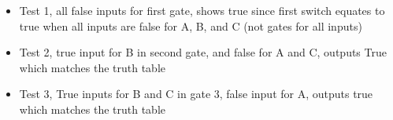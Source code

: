 \documentclass{article}
\begin{document}
\begin{itemize}
    \item Test 1, all false inputs for first gate, shows true since first switch equates to true when all inputs are false for A, B, and C (not gates for all inputs)\newline
    \newline
    
    \item Test 2, true input for B in second gate, and false for A and C, outputs True which matches the truth table\newline
    \newline
    
    \item Test 3, True inputs for B and C in gate 3, false input for A, outputs true which matches the truth table \newline
    \newline
    

\end{itemize}
\end{document}
